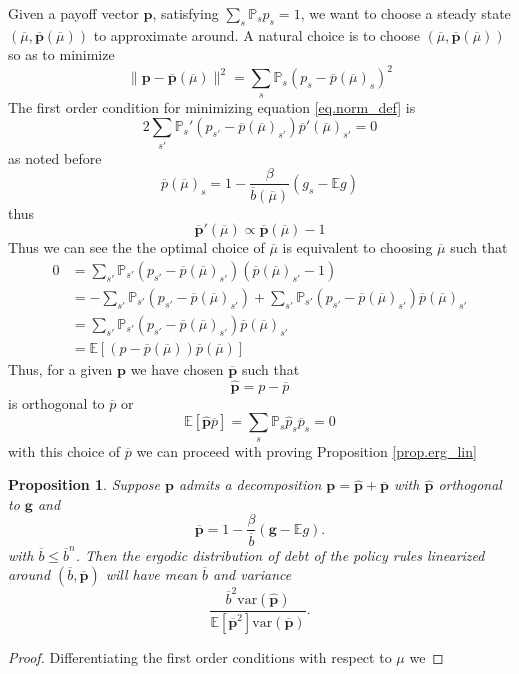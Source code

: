 \documentclass[12pt]{article}
\newcommand{\EE}{\mathbb E}
\newtheorem*{proposition*}{Proposition}
\newcommand{\var}{\text{var}}
\newcommand{\pbar}{{\overline p}}
\newcommand{\bbar}{{\overline b}}
\newcommand{\mubar}{{\overline \mu}}
\begin{document}
\begin{appendix}
Given a payoff vector $\bm p$, satisfying $\sum_s\mathbb P_sp_s =1$, we want to choose a steady state $(\mubar,\bm\pbar(\mubar))$ to approximate around.  A natural choice is to choose $(\mubar,\bm\pbar(\mubar))$ so as to minimize
\begin{equation}
	\|\bm p-\bm\pbar(\mubar)\|^2 = \sum_s \mathbb P_s(p_s-\pbar(\mubar)_s)^2\label{eq.norm_def}
\end{equation}The first order condition for minimizing equation \eqref{eq.norm_def} is
\[
	2\sum_{s'}\mathbb P_s'( p_{s'}-\pbar(\mubar)_{s'}) \pbar'(\mubar)_{s'} = 0
\]as noted before 
\[
	\pbar(\mubar)_s =  1 -\frac{\beta}{\bbar(\mubar)}\left(g_s - \EE g\right)
\]thus
\[
	\bm \pbar'(\mubar) \propto \bm\pbar(\mubar)-1
\]Thus we can see the the optimal choice of $\mubar$ is equivalent to choosing $\mubar$ such that 
\begin{equation}
	\begin{split}
		0 &= \sum_{s'}\mathbb P_{s'}( p_{s'} - \pbar(\mubar)_{s'})(\pbar(\mubar)_{s'}-1)\\
		&= -\sum_{s'}\mathbb P_{s'}( p_{s'}-\pbar(\mubar)_{s'}) + \sum_{s'}\mathbb P_{s'}( p_{s'}-\pbar(\mubar)_{s'})\pbar(\mubar)_{s'}\\
		&= \sum_{s'}\mathbb P_{s'}( p_{s'}-\pbar(\mubar)_{s'})\pbar(\mubar)_{s'}\\
		&=\EE\left[( p-\pbar(\mubar))\pbar(\mubar)\right]
	\end{split}
\end{equation}  Thus, for a given $\bm p$ we have chosen $\bm \pbar$ such that 
\[
	\hat{ \bm p} = p - \pbar
\] is orthogonal to $\pbar$ or 
\[
	\EE[\hat{\bm p}\pbar] = \sum_s\mathbb P_s\hat p_s\pbar_s = 0
\]  with this choice of $\pbar$ we can proceed with proving Proposition \ref{prop.erg_lin}
\begin{proposition*}
Suppose $\bm p$ admits a decomposition $\bm p = \hat{\bm p} +\overline{\bm p}$ with $\hat{\bm p}$ orthogonal to $\bm g$ and
\[
	\overline{\bm p} = 1- \frac{\beta}{\overline b}(\bm g - \EE g).
\] with $\overline b \leq \overline b^n$.  Then the ergodic distribution of debt of the policy rules linearized around $(\overline b, \overline{\bm p})$ will have mean $\overline b$ and variance
\begin{equation}\label{eq.var_lin}
	\frac{\overline b^2 \var(\hat{\bm p})}{\EE[\overline{\bm p}^2]\var(\overline{\bm p})}.
\end{equation}
\end{proposition*}
\begin{proof}
	Differentiating the first order conditions with respect to $\mu$ we 

\end{proof}
\end{appendix}
\end{document}
